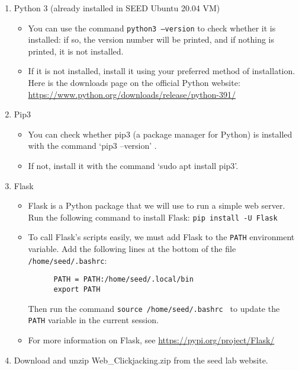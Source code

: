 \begin{enumerate}
    \item Python 3 (already installed in SEED Ubuntu 20.04 VM)
    \begin{itemize}
        \item You can use the command \texttt{python3 --version} to check
        whether it is installed: if so, the version number will be 
        printed, and if nothing is printed, it is not installed.  
        \item If it is not installed, install it using your preferred 
        method of installation. Here is the downloads page on the 
        official Python website:
        \href{https://www.python.org/downloads/release/python-391/}{https://www.python.org/downloads/release/python-391/}
    \end{itemize}

    \item Pip3
    \begin{itemize}
      \item You can check whether pip3 (a package manager for Python) is
      installed  with the command `pip3 --version' .
      \item If not, install it with the command `sudo apt install pip3'.
    \end{itemize}

    \item Flask 
    \begin{itemize}
      \item Flask is a Python package that we will use to run a simple
      web server.  Run the following command to install Flask: 
      \texttt{pip install -U Flask}
      \item To call Flask's scripts easily, we must add Flask to the
      \texttt{PATH} environment variable.  Add the following lines at 
      the bottom of the file {\tt /home/seed/.bashrc}:

      \begin{verbatim}
      PATH = PATH:/home/seed/.local/bin
      export PATH
      \end{verbatim}
      Then run the command {\tt source /home/seed/.bashrc } to update 
      the \texttt{PATH} variable in the current session.

      \item For more information on Flask, see 
      \href{https://pypi.org/project/Flask/}{https://pypi.org/project/Flask/}
    \end{itemize}
    
    \item Download and unzip Web\_Clickjacking.zip from the seed lab website.
\end{enumerate}



